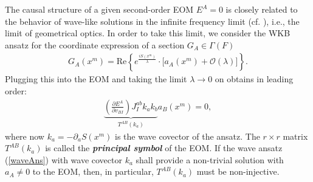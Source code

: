 \documentclass[%
 reprint,
nofootinbib,
 amsmath,amssymb,
 aps,
 prd,
floatfix,
]{revtex4-2}
\begin{document}
The causal structure of a given second-order EOM $E^A=0$ is closely related to the behavior of wave-like solutions in the infinite frequency limit (cf. \cite{2018PhRvD..97h4036D}), i.e., the limit of geometrical optics. In order to take this limit, we consider the WKB ansatz for the coordinate expression of a section $G_A \in \Gamma(F)$
\begin{align}\label{waveAns}
    G_A(x^m) = \mathrm{Re}\left \{ e^{\frac{iS(x^m)}{\lambda}} \cdot   \bigl [ a_A(x^m) + \mathcal{O}(\lambda) \bigr ]\right \}.
\end{align}
Plugging this into the EOM and taking the limit $\lambda \rightarrow 0$ on obtains in leading order:
\begin{align}
    \underbrace{\left ( \frac{\partial E^A }{\partial v_{BI}} \right ) J_{I}^{ab} k_a k_b}_{T^{AB}(k_a)} a_B(x^m) = 0,
\end{align}
where now $k_a = - \partial_aS(x^m)$ is the wave covector of the ansatz. The $r\times r$ matrix $T^{AB}(k_a)$ is called the \textit{\textbf{principal symbol}} of the EOM. If the wave ansatz (\ref{waveAns}) with wave covector $k_a$ shall provide a non-trivial solution with $a_A \neq 0$ to the EOM, then, in particular,  $T^{AB}(k_a)$ must be non-injective. 
\end{document}
